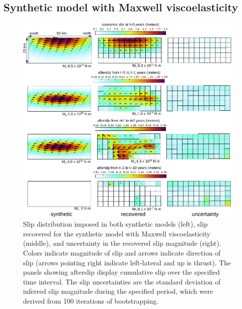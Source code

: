 \subsection{Synthetic model with Maxwell viscoelasticity}\label{MaxModel}

\begin{figure}\label{figure3}
  \centering
  \includegraphics{ch2/figures/Fig3.pdf}
  \caption{Slip distribution imposed in both synthetic models (left),
    slip recovered for the synthetic model with Maxwell
    viscoelasticity (middle), and uncertainty in the recovered slip
    magnitude (right).  Colors indicate magnitude of slip and arrows
    indicate direction of slip (arrows pointing right indicate
    left-lateral and up is thrust).  The panels showing afterslip
    display cumulative slip over the specified time interval.  The
    slip uncertainties are the standard deviation of inferred slip
    magnitude during the specified period, which were derived from 100
    iterations of bootstrapping.}
  \label{Figure 3}
\end{figure}

